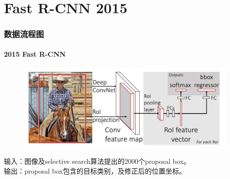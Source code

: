 \documentclass{beamer}
\begin{document}
\section{Fast R-CNN 2015}

\begin{frame}
    \frametitle{数据流程图}
    \framesubtitle{2015 Fast R-CNN}
    \begin{figure}
        \centering
        \includegraphics[height=4.3cm]{graphic/fastrcnnflow.jpg}
    \end{figure}
    输入：图像及selective search算法提出的2000个proposal box。  \\
    输出：proposal box包含的目标类别，及修正后的位置坐标。  \\
\end{frame}

\end{document}
